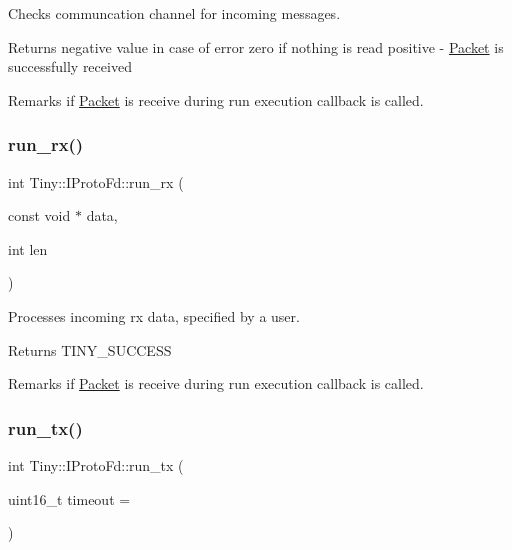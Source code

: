 Checks communcation channel for incoming messages. \begin{DoxyReturn}{Returns}
negative value in case of error zero if nothing is read positive -\/ \hyperlink{classTiny_1_1Packet}{Packet} is successfully received 
\end{DoxyReturn}
\begin{DoxyRemark}{Remarks}
if \hyperlink{classTiny_1_1Packet}{Packet} is receive during run execution callback is called. 
\end{DoxyRemark}
\mbox{\label{classTiny_1_1IProtoFd_ab297fec86ef473612a745865403b4dd0}} 
\subsubsection{\texorpdfstring{run\+\_\+rx()}{run\_rx()}\hspace{0.1cm}{\footnotesize\ttfamily [2/2]}}
{\footnotesize\ttfamily int Tiny\+::\+I\+Proto\+Fd\+::run\+\_\+rx (\begin{DoxyParamCaption}\item[{const void $\ast$}]{data,  }\item[{int}]{len }\end{DoxyParamCaption})}

Processes incoming rx data, specified by a user. \begin{DoxyReturn}{Returns}
T\+I\+N\+Y\+\_\+\+S\+U\+C\+C\+E\+SS 
\end{DoxyReturn}
\begin{DoxyRemark}{Remarks}
if \hyperlink{classTiny_1_1Packet}{Packet} is receive during run execution callback is called. 
\end{DoxyRemark}
\mbox{\label{classTiny_1_1IProtoFd_a19be0bd5124009c7de051554841070b3}} 
\subsubsection{\texorpdfstring{run\+\_\+tx()}{run\_tx()}\hspace{0.1cm}{\footnotesize\ttfamily [1/2]}}
{\footnotesize\ttfamily int Tiny\+::\+I\+Proto\+Fd\+::run\+\_\+tx (\begin{DoxyParamCaption}\item[{uint16\+\_\+t}]{timeout = {} }\end{DoxyParamCaption})}

